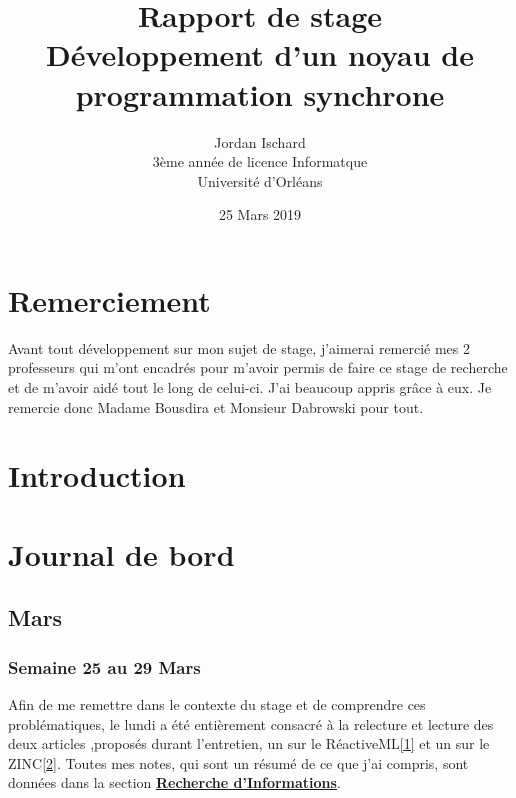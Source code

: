 \documentclass[10pt,a4paper]{article}
\begin{document}
		
	\title{\textbf{Rapport de stage \\ Développement d'un noyau de programmation synchrone}}
	\date{25 Mars 2019}
	\author{Jordan Ischard\\3ème année de licence Informatque \\ Université d'Orléans}
	\maketitle
	\newpage
	
	
	\tableofcontents
	\newpage
	
	\section{Remerciement}
		Avant tout développement sur mon sujet de stage, j'aimerai remercié mes 2 professeurs qui m'ont encadrés pour m'avoir permis de faire ce stage de recherche et de m'avoir aidé tout le long de celui-ci. J'ai beaucoup appris grâce à eux. Je remercie donc Madame Bousdira et Monsieur Dabrowski pour tout.
	\bigbreak
	
	\section{Introduction}
	
	
	
	\newpage
	
	\section{Journal de bord}
		\subsection{Mars}
			\subsubsection{Semaine 25 au 29 Mars}
			\medbreak
			Afin de me remettre dans le contexte du stage et de comprendre ces problématiques, le lundi a été entièrement consacré à la relecture et lecture des deux articles ,proposés durant l'entretien, un sur le RéactiveML\hyperref[ReactiveML]{[1]} et un sur le ZINC\hyperref[ZINC]{[2]}.
			\medbreak
			Toutes mes notes, qui sont un résumé de ce que j'ai compris, sont données dans la section \hyperref[Recherche]{\textbf{Recherche d'Informations}}.
			\medbreak
			
\end{document}
